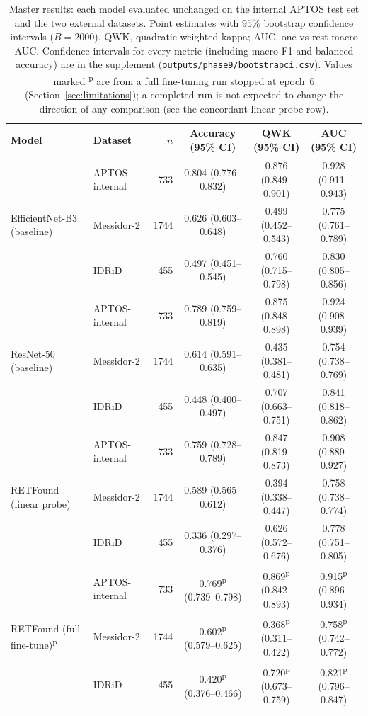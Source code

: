 \documentclass[journal]{IEEEtran}
\newcommand{\pv}[1]{#1\textsuperscript{p}}
\renewcommand{\_}{\origunderscore\allowbreak}
\begin{document}
\begin{table}[!t]
\centering\footnotesize
\caption{Master results: each model evaluated unchanged on the internal APTOS test
set and the two external datasets. Point estimates with $95\%$ bootstrap
confidence intervals ($B=2000$). QWK, quadratic-weighted kappa; AUC, one-vs-rest
macro AUC. Confidence intervals for every metric (including macro-F1 and balanced
accuracy) are in the supplement (\texttt{outputs/\allowbreak{}phase9/\allowbreak{}bootstrap\_ci.csv}).
Values marked \textsuperscript{p} are from a full fine-tuning run stopped at
epoch~6 (Section~\ref{sec:limitations}); a completed run is not expected to change
the direction of any comparison (see the concordant linear-probe row).}
\label{tab:master}
\setlength{\tabcolsep}{5pt}
\begin{tabular}{llrccc}
\toprule
Model & Dataset & $n$ & Accuracy (95\% CI) & QWK (95\% CI) & AUC (95\% CI) \\
\midrule
\multirow{3}{*}{EfficientNet-B3 (baseline)}
 & APTOS-internal & 733  & 0.804 (0.776--0.832) & 0.876 (0.849--0.901) & 0.928 (0.911--0.943) \\
 & Messidor-2     & 1744 & 0.626 (0.603--0.648) & 0.499 (0.452--0.543) & 0.775 (0.761--0.789) \\
 & IDRiD          & 455  & 0.497 (0.451--0.545) & 0.760 (0.715--0.798) & 0.830 (0.805--0.856) \\
\midrule
\multirow{3}{*}{ResNet-50 (baseline)}
 & APTOS-internal & 733  & 0.789 (0.759--0.819) & 0.875 (0.848--0.898) & 0.924 (0.908--0.939) \\
 & Messidor-2     & 1744 & 0.614 (0.591--0.635) & 0.435 (0.381--0.481) & 0.754 (0.738--0.769) \\
 & IDRiD          & 455  & 0.448 (0.400--0.497) & 0.707 (0.663--0.751) & 0.841 (0.818--0.862) \\
\midrule
\multirow{3}{*}{RETFound (linear probe)}
 & APTOS-internal & 733  & 0.759 (0.728--0.789) & 0.847 (0.819--0.873) & 0.908 (0.889--0.927) \\
 & Messidor-2     & 1744 & 0.589 (0.565--0.612) & 0.394 (0.338--0.447) & 0.758 (0.738--0.774) \\
 & IDRiD          & 455  & 0.336 (0.297--0.376) & 0.626 (0.572--0.676) & 0.778 (0.751--0.805) \\
\midrule
\multirow{3}{*}{RETFound (full fine-tune)\textsuperscript{p}}
 & APTOS-internal & 733  & \pv{0.769} (0.739--0.798) & \pv{0.869} (0.842--0.893) & \pv{0.915} (0.896--0.934) \\
 & Messidor-2     & 1744 & \pv{0.602} (0.579--0.625) & \pv{0.368} (0.311--0.422) & \pv{0.758} (0.742--0.772) \\
 & IDRiD          & 455  & \pv{0.420} (0.376--0.466) & \pv{0.720} (0.673--0.759) & \pv{0.821} (0.796--0.847) \\
\bottomrule
\end{tabular}
\end{table}
\end{document}
